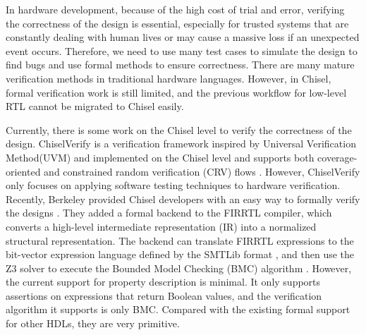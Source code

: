 \documentclass[conference]{IEEEtran}
\theoremstyle{definition}
\begin{document}
In hardware development, because of the high cost of trial and error, verifying the correctness of the design is essential, especially for trusted systems that are constantly dealing with human lives or may cause a massive loss if an unexpected event occurs. Therefore, we need to use many test cases to simulate the design to find bugs and use formal methods to ensure correctness. There are many mature verification methods in traditional hardware languages. However, in Chisel, formal verification work is still limited, and the previous workflow for low-level RTL cannot be migrated to Chisel easily.

Currently, there is some work on the Chisel level to verify the correctness of the design. ChiselVerify is a verification framework inspired by Universal Verification Method(UVM) \cite{mehta2018uvm} and implemented on the Chisel level and supports both coverage-oriented and constrained random verification (CRV) flows \cite{dobis2021chiselverify}. However, ChiselVerify only focuses on applying software testing techniques to hardware verification.
Recently, Berkeley provided Chisel developers with an easy way to formally verify the designs \cite{dobis2021open}. They added a formal backend to the FIRRTL compiler, which converts a high-level intermediate representation (IR) into a normalized structural representation. The backend can translate FIRRTL expressions to the bit-vector expression language defined by the SMTLib format \cite{barrett2010smt}, and then use the Z3 solver \cite{moura2008z3} to execute the Bounded Model Checking (BMC) algorithm \cite{biere2009bounded}.
However, the current support for property description is minimal. It only supports assertions on expressions that return Boolean values, and the verification algorithm it supports is only BMC. Compared with the existing formal support for other HDLs, they are very primitive.
\end{document}
